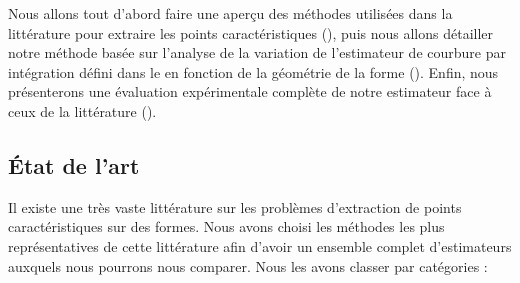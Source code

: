 %
%
%
%
%
Nous allons tout d'abord faire une aperçu des méthodes utilisées dans la
littérature pour extraire les points caractéristiques
(), puis nous allons détailler notre
méthode basée sur l'analyse de la variation de l'estimateur de courbure par
intégration défini dans le  en fonction de la
géométrie de la forme (). Enfin, nous
présenterons une évaluation expérimentale complète de notre estimateur face à
ceux de la littérature ().
%
\subsection{État de l'art}%
\label{sec:applications:feature:SOTA}
%
Il existe une très vaste littérature sur les problèmes d'extraction de points
caractéristiques sur des formes. Nous avons choisi les méthodes les plus
représentatives de cette littérature afin d'avoir un ensemble complet
d'estimateurs auxquels nous pourrons nous comparer. Nous les avons classer par
catégories :
%
%
